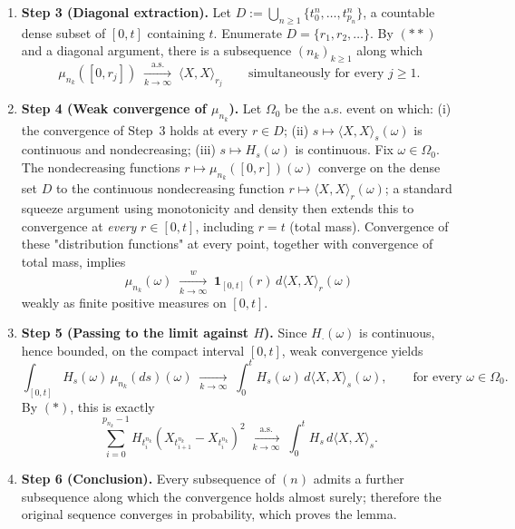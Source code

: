 \documentclass[../Main.tex]{subfiles}
\begin{document}
{\begin{enumerate}
\item \textbf{Step 3 (Diagonal extraction).}
Let $D := \bigcup_{n \ge 1} \{ t_0^n, \dots, t_{p_n}^n \}$, a countable dense subset of
$[0,t]$ containing $t$. Enumerate $D = \{r_1, r_2, \dots\}$. By $(**)$ and a diagonal
argument, there is a subsequence $(n_k)_{k \ge 1}$ along which
$$
\mu_{n_k}([0, r_j]) \;\xrightarrow[k \to \infty]{\text{a.s.}}\; \langle X, X \rangle_{r_j}
\qquad \text{simultaneously for every } j \ge 1.
$$

\item \textbf{Step 4 (Weak convergence of $\mu_{n_k}$).}
Let $\Omega_0$ be the a.s. event on which: (i) the convergence of Step~3 holds at every
$r \in D$; (ii) $s \mapsto \langle X,X\rangle_s(\omega)$ is continuous and nondecreasing;
(iii) $s \mapsto H_s(\omega)$ is continuous. Fix $\omega \in \Omega_0$. The nondecreasing
functions $r \mapsto \mu_{n_k}([0,r])(\omega)$ converge on the dense set $D$ to the
continuous nondecreasing function $r \mapsto \langle X,X \rangle_r(\omega)$; a standard
squeeze argument using monotonicity and density then extends this to convergence at
\emph{every} $r \in [0,t]$, including $r = t$ (total mass). Convergence of these
"distribution functions" at every point, together with convergence of total mass, implies
$$
\mu_{n_k}(\omega) \;\xrightarrow[k \to \infty]{w}\;
\mathbf{1}_{[0,t]}(r) \, d\langle X, X \rangle_r(\omega)
$$
weakly as finite positive measures on $[0,t]$.

\item \textbf{Step 5 (Passing to the limit against $H$).}
Since $H_\cdot(\omega)$ is continuous, hence bounded, on the compact interval $[0,t]$,
weak convergence yields
$$
\int_{[0,t]} H_s(\omega) \, \mu_{n_k}(ds)(\omega)
\;\xrightarrow[k \to \infty]{}\;
\int_0^t H_s(\omega) \, d\langle X, X \rangle_s(\omega),
\qquad \text{for every } \omega \in \Omega_0.
$$
By $(*)$, this is exactly
$$
\sum_{i=0}^{p_{n_k}-1} H_{t_i^{n_k}}
\left( X_{t_{i+1}^{n_k}} - X_{t_i^{n_k}} \right)^2
\;\xrightarrow[k \to \infty]{\text{a.s.}}\;
\int_0^t H_s \, d\langle X, X \rangle_s .
$$

\item \textbf{Step 6 (Conclusion).}
Every subsequence of $(n)$ admits a further subsequence along which the convergence
holds almost surely; therefore the original sequence converges in probability, which
proves the lemma.
\end{enumerate}
}
\end{document}
